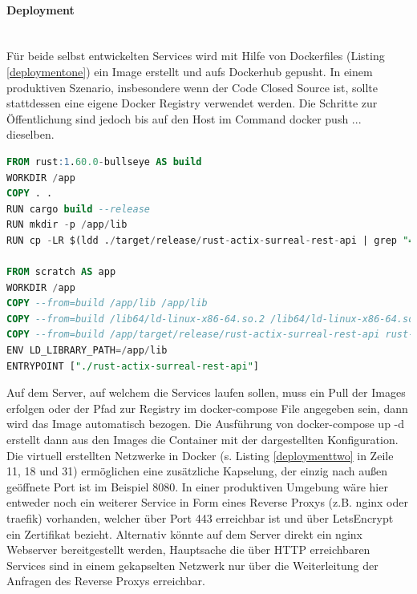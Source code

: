 \documentclass[notitlepage, hidelinks]{article}
\begin{document}
\paragraph{Deployment} \mbox{} \\
Für beide selbst entwickelten Services wird mit Hilfe von Dockerfiles (Listing \ref{deploymentone}) ein Image erstellt und aufs Dockerhub gepusht. In einem produktiven Szenario, insbesondere wenn der Code Closed Source ist, sollte stattdessen eine eigene Docker Registry verwendet werden. Die Schritte zur Öffentlichung sind jedoch bis auf den Host im Command docker push ... dieselben. 

\begin{lstlisting}[language=SQL,frame=single,caption=Dockerfile für die Erstellung des REST-API Images ,label=deploymentone]
FROM rust:1.60.0-bullseye AS build
WORKDIR /app
COPY . .
RUN cargo build --release
RUN mkdir -p /app/lib
RUN cp -LR $(ldd ./target/release/rust-actix-surreal-rest-api | grep "=>" | cut -d ' ' -f 3) /app/lib

FROM scratch AS app
WORKDIR /app
COPY --from=build /app/lib /app/lib
COPY --from=build /lib64/ld-linux-x86-64.so.2 /lib64/ld-linux-x86-64.so.2
COPY --from=build /app/target/release/rust-actix-surreal-rest-api rust-actix-surreal-rest-api
ENV LD_LIBRARY_PATH=/app/lib
ENTRYPOINT ["./rust-actix-surreal-rest-api"]
\end{lstlisting}

Auf dem Server, auf welchem die Services laufen sollen, muss ein Pull der Images erfolgen oder der Pfad zur Registry im docker-compose File angegeben sein, dann wird das Image automatisch bezogen. Die Ausführung von docker-compose up -d erstellt dann aus den Images die Container mit der dargestellten Konfiguration. Die virtuell erstellten Netzwerke in Docker (s. Listing \ref{deploymenttwo} in Zeile 11, 18 und 31) ermöglichen eine zusätzliche Kapselung, der einzig nach außen geöffnete Port ist im Beispiel 8080. In einer produktiven Umgebung wäre hier entweder noch ein weiterer Service in Form eines Reverse Proxys (z.B. nginx oder traefik) vorhanden, welcher über Port 443 erreichbar ist und über LetsEncrypt ein Zertifikat bezieht. Alternativ könnte auf dem Server direkt ein nginx Webserver bereitgestellt werden, Hauptsache die über HTTP erreichbaren Services sind in einem gekapselten Netzwerk nur über die Weiterleitung der Anfragen des Reverse Proxys erreichbar. 
\end{document}
